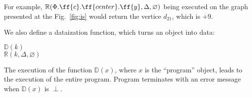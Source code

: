 For example, $\mathbb{R}(\Phi.\ff{c}.\ff{center}.\ff{y},
\Delta, \varnothing)$ being executed on the graph presented at the
Fig.~\ref{fig:is} would return the vertice \(d_{21}\), which is \(+9\).

We also define a dataization function, which turns an object into data:

\begin{algo}
 \(\mathbb{D}(k)\) \\
  \tab {} \(\mathbb{R}(k, \Delta, \varnothing)\) \\
\end{algo}

The execution of the function \(\mathbb{D}(x)\), where \(x\) is the
``program'' object, leads to the execution of the entire program.
Program terminates with an error message when \(\mathbb{D}(x)\) is \(\perp\).

